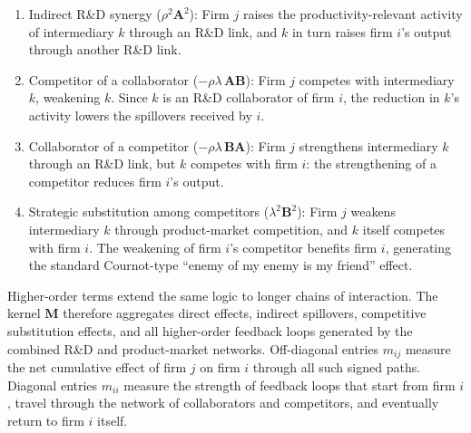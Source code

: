 \begin{enumerate}
\item Indirect R\&D synergy ($\rho^2\mathbf{A}^2$):
    Firm $j$ raises the productivity-relevant activity of intermediary $k$
    through an R\&D link, and $k$ in turn raises firm $i$'s output through
    another R\&D link.
\item Competitor of a collaborator ($-\rho\lambda\,\mathbf{A}\mathbf{B}$):
    Firm $j$ competes with intermediary $k$, weakening $k$. Since $k$ is an
    R\&D collaborator of firm $i$, the reduction in $k$'s activity lowers the
    spillovers received by $i$.
\item Collaborator of a competitor ($-\rho\lambda\,\mathbf{B}\mathbf{A}$):
    Firm $j$ strengthens intermediary $k$ through an R\&D link, but $k$
    competes with firm $i$: the strengthening of a competitor reduces firm
    $i$'s output.
\item Strategic substitution among competitors ($\lambda^2\mathbf{B}^2$):
    Firm $j$ weakens intermediary $k$ through product-market competition, and
    $k$ itself competes with firm $i$. The weakening of firm $i$'s competitor
    benefits firm $i$, generating the standard Cournot-type ``enemy of my
    enemy is my friend'' effect.
\end{enumerate}
Higher-order terms extend the same logic to longer chains of interaction. The
kernel $\mathbf{M}$ therefore aggregates direct effects, indirect spillovers,
competitive substitution effects, and all higher-order feedback loops generated
by the combined R\&D and product-market networks. Off-diagonal entries $m_{ij}$
measure the net cumulative effect of firm $j$ on firm $i$ through all such
signed paths. Diagonal entries $m_{ii}$ measure the strength of feedback loops
that start from firm $i$, travel through the network of collaborators and
competitors, and eventually return to firm $i$ itself.

